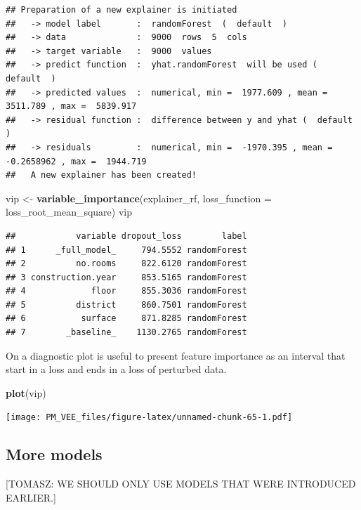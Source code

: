 \documentclass[12pt,]{krantz}
\newenvironment{Shaded}{\begin{snugshade}}{\end{snugshade}}
\newcommand{\DataTypeTok}[1]{\textcolor[rgb]{0.13,0.29,0.53}{#1}}
\newcommand{\KeywordTok}[1]{\textcolor[rgb]{0.13,0.29,0.53}{\textbf{#1}}}
\newcommand{\NormalTok}[1]{#1}
\newcommand{\StringTok}[1]{\textcolor[rgb]{0.31,0.60,0.02}{#1}}
\begin{document}
\begin{verbatim}
## Preparation of a new explainer is initiated
##   -> model label       :  randomForest  (  default  )
##   -> data              :  9000  rows  5  cols 
##   -> target variable   :  9000  values 
##   -> predict function  :  yhat.randomForest  will be used (  default  )
##   -> predicted values  :  numerical, min =  1977.609 , mean =  3511.789 , max =  5839.917  
##   -> residual function :  difference between y and yhat (  default  )
##   -> residuals         :  numerical, min =  -1970.395 , mean =  -0.2658962 , max =  1944.719  
##   A new explainer has been created!
\end{verbatim}

\begin{Shaded}
\begin{Highlighting}[]
\NormalTok{vip <-}\StringTok{ }\KeywordTok{variable_importance}\NormalTok{(explainer_rf, }
            \DataTypeTok{loss_function =}\NormalTok{ loss_root_mean_square)}
\NormalTok{vip}
\end{Highlighting}
\end{Shaded}

\begin{verbatim}
##            variable dropout_loss        label
## 1      _full_model_     794.5552 randomForest
## 2          no.rooms     822.6120 randomForest
## 3 construction.year     853.5165 randomForest
## 4             floor     855.3036 randomForest
## 5          district     860.7501 randomForest
## 6           surface     871.8285 randomForest
## 7        _baseline_    1130.2765 randomForest
\end{verbatim}

On a diagnostic plot is useful to present feature importance as an interval that start in a loss and ends in a loss of perturbed data.

\begin{Shaded}
\begin{Highlighting}[]
\KeywordTok{plot}\NormalTok{(vip)}
\end{Highlighting}
\end{Shaded}

\texttt{[image: PM\_VEE\_files/figure-latex/unnamed-chunk-65-1.pdf]}

\hypertarget{more-models}{%
\subsection{More models}\label{more-models}}

{[}TOMASZ: WE SHOULD ONLY USE MODELS THAT WERE INTRODUCED EARLIER.{]}
\end{document}

